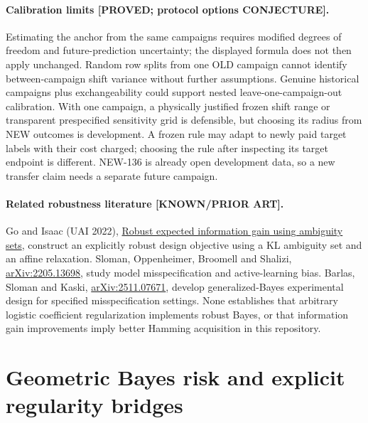 \documentclass[11pt]{article}
\theoremstyle{definition}
\theoremstyle{remark}
\begin{document}
\paragraph{Calibration limits [PROVED; protocol options CONJECTURE].}
Estimating the anchor from the same campaigns requires modified degrees
of freedom and future-prediction uncertainty; the displayed formula
does not then apply unchanged.  Random row splits from one OLD campaign
cannot identify between-campaign shift variance without further
assumptions.  Genuine historical campaigns plus exchangeability could
support nested leave-one-campaign-out calibration.  With one campaign,
a physically justified frozen shift range or transparent prespecified
sensitivity grid is defensible, but choosing its radius from NEW outcomes
is development.  A frozen rule may adapt to newly paid target labels
with their cost charged; choosing the rule after inspecting its target
endpoint is different.  NEW-136 is already open development data, so a
new transfer claim needs a separate future campaign.

\paragraph{Related robustness literature [KNOWN/PRIOR ART].}
Go and Isaac (UAI 2022),
\href{https://proceedings.mlr.press/v180/go22a.html}{Robust expected information gain using ambiguity sets},
construct an explicitly robust design objective using a KL ambiguity set
and an affine relaxation.  Sloman, Oppenheimer, Broomell and Shalizi,
\href{https://arxiv.org/abs/2205.13698}{arXiv:2205.13698},
study model misspecification and active-learning bias.  Barlas, Sloman
and Kaski,
\href{https://arxiv.org/abs/2511.07671}{arXiv:2511.07671},
develop generalized-Bayes experimental design for specified
misspecification settings.  None establishes that arbitrary logistic
coefficient regularization implements robust Bayes, or that information
gain improvements imply better Hamming acquisition in this repository.



\section{Geometric Bayes risk and explicit regularity bridges}
\end{document}
